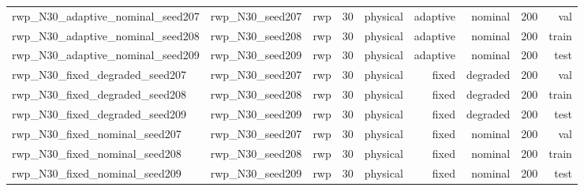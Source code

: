 \begin{tabular}{lrrrrrrrr}
rwp\_N30\_adaptive\_nominal\_seed207 & rwp\_N30\_seed207 & rwp & 30 & physical & adaptive & nominal & 200 & val \\
rwp\_N30\_adaptive\_nominal\_seed208 & rwp\_N30\_seed208 & rwp & 30 & physical & adaptive & nominal & 200 & train \\
rwp\_N30\_adaptive\_nominal\_seed209 & rwp\_N30\_seed209 & rwp & 30 & physical & adaptive & nominal & 200 & test \\
rwp\_N30\_fixed\_degraded\_seed207 & rwp\_N30\_seed207 & rwp & 30 & physical & fixed & degraded & 200 & val \\
rwp\_N30\_fixed\_degraded\_seed208 & rwp\_N30\_seed208 & rwp & 30 & physical & fixed & degraded & 200 & train \\
rwp\_N30\_fixed\_degraded\_seed209 & rwp\_N30\_seed209 & rwp & 30 & physical & fixed & degraded & 200 & test \\
rwp\_N30\_fixed\_nominal\_seed207 & rwp\_N30\_seed207 & rwp & 30 & physical & fixed & nominal & 200 & val \\
rwp\_N30\_fixed\_nominal\_seed208 & rwp\_N30\_seed208 & rwp & 30 & physical & fixed & nominal & 200 & train \\
rwp\_N30\_fixed\_nominal\_seed209 & rwp\_N30\_seed209 & rwp & 30 & physical & fixed & nominal & 200 & test \\
\bottomrule
\end{tabular}